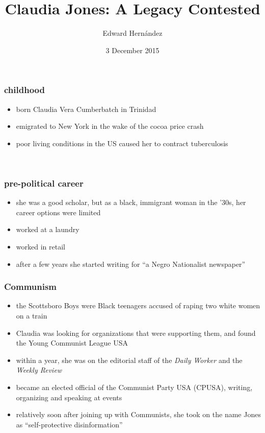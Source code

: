 \documentclass{beamer}
\title{{C}laudia {J}ones: A Legacy Contested}
\author{Edward Hern\'{a}ndez}
\institute{}
\date{3 December 2015}
\begin{document}
\begin{frame} 
\titlepage
\end{frame}

\begin{frame} 
	\frametitle{childhood}
	\begin{itemize}
		\item born Claudia Vera Cumberbatch in Trinidad
		\item emigrated to New York in the wake of the cocoa price crash
		\item poor living conditions in the US caused her to contract tuberculosis
	\end{itemize}

	\vfill
	\ \hfill \citep{Davies08}
\end{frame}

\begin{frame} 
	\frametitle{pre-political career}
	\begin{itemize}
		\item she was a good scholar, but as a black, immigrant woman in the '30s, her career options were limited
		\item worked at a laundry
		\item worked in retail
		\item after a few years she started writing for ``a Negro Nationalist newspaper'' \citep[ch.~2]{Davies08}
	\end{itemize}
\end{frame}

\begin{frame} 
	\frametitle{Communism}
	\begin{itemize}
		\item the Scottsboro Boys were Black teenagers accused of raping two white women on a train
		\item Claudia was looking for organizations that were supporting them, and found the Young Communist League USA
		\item within a year, she was on the editorial staff of the \emph{Daily Worker} and the \emph{Weekly Review}
		\item became an elected official of the Communist Party USA (CPUSA), writing, organizing and speaking at events
		\item relatively soon after joining up with Communists, she took on the name Jones as ``self-protective disinformation'' \citep{Taylor08P}
	\end{itemize}

	\vfill
	\ \hfill \citep{Davis15P}
\end{frame}
\end{document}
